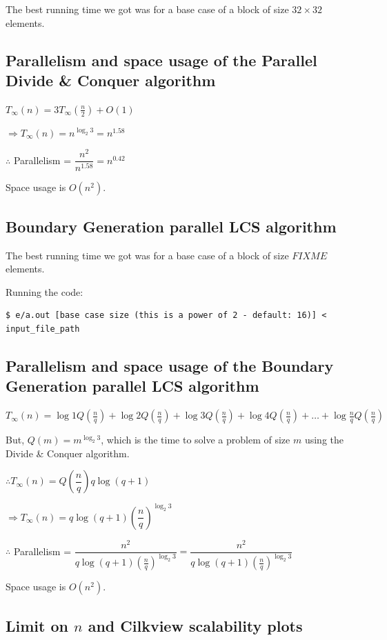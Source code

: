\documentclass{article}
\begin{document}
The best running time we got was for a base case of a block of size $32 \times 32$ elements.

\subsection{Parallelism and space usage of the Parallel Divide \& Conquer algorithm}

$T_{\infty}(n) = 3T_{\infty}(\frac{n}{2}) + O(1)$

$\Rightarrow T_{\infty}(n) = n^{\log_2{3}} = n^{1.58}$

$\therefore$ Parallelism = $\dfrac{n^2}{n^{1.58}} = n^{0.42}$

Space usage is $O(n^2)$.

\subsection{Boundary Generation parallel LCS algorithm}

The best running time we got was for a base case of a block of size $FIXME$ elements.

Running the code:
\begin{verbatim}
$ e/a.out [base case size (this is a power of 2 - default: 16)] < input_file_path
\end{verbatim}

\subsection{Parallelism and space usage of the Boundary Generation parallel LCS algorithm}

$T_{\infty}(n) = \log{1}Q(\frac{n}{q}) + \log{2}Q(\frac{n}{q}) + \log{3}Q(\frac{n}{q}) + \log{4}Q(\frac{n}{q}) + \ldots{} + \log{\frac{n}{q}}Q(\frac{n}{q})$

But, $Q(m) = m^{\log_2{3}}$, which is the time to solve a problem of size $m$ using the Divide \& Conquer algorithm.

$\therefore T_{\infty}(n) = Q(\dfrac{n}{q})q\log{(q+1)}$

$\Rightarrow T_{\infty}(n) = q\log{(q+1)}\left(\dfrac{n}{q}\right)^{\log_2{3}}$

$\therefore$ Parallelism = $\dfrac{n^2}{q\log{(q+1)}(\frac{n}{q})^{\log_2{3}}} = \dfrac{n^2}{q\log{(q+1)}(\frac{n}{q})^{\log_2{3}}}$

Space usage is $O(n^2)$.

\subsection{Limit on $n$ and Cilkview scalability plots}
\end{document}
